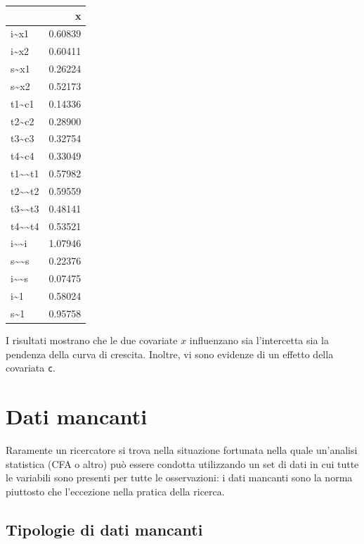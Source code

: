 \documentclass[
  11pt,
]{krantz}
\theoremstyle{definition}
\theoremstyle{definition}
\theoremstyle{definition}
\theoremstyle{definition}
\theoremstyle{remark}
\begin{document}
\begin{longtable}[]{@{}lr@{}}
\toprule
& x \\
\midrule
\endhead
i\textasciitilde x1 & 0.60839 \\
i\textasciitilde x2 & 0.60411 \\
s\textasciitilde x1 & 0.26224 \\
s\textasciitilde x2 & 0.52173 \\
t1\textasciitilde c1 & 0.14336 \\
t2\textasciitilde c2 & 0.28900 \\
t3\textasciitilde c3 & 0.32754 \\
t4\textasciitilde c4 & 0.33049 \\
t1\textasciitilde\textasciitilde t1 & 0.57982 \\
t2\textasciitilde\textasciitilde t2 & 0.59559 \\
t3\textasciitilde\textasciitilde t3 & 0.48141 \\
t4\textasciitilde\textasciitilde t4 & 0.53521 \\
i\textasciitilde\textasciitilde i & 1.07946 \\
s\textasciitilde\textasciitilde s & 0.22376 \\
i\textasciitilde\textasciitilde s & 0.07475 \\
i\textasciitilde1 & 0.58024 \\
s\textasciitilde1 & 0.95758 \\
\bottomrule
\end{longtable}

I risultati mostrano che le due covariate \(x\) influenzano sia l'intercetta sia la pendenza della curva di crescita. Inoltre, vi sono evidenze di un effetto della covariata \texttt{c}.

\hypertarget{ch:missing_data}{%
\chapter{Dati mancanti}\label{ch:missing_data}}

Raramente un ricercatore si trova nella situazione fortunata nella quale un'analisi statistica (CFA o altro) può essere condotta utilizzando un set di dati in cui tutte le variabili sono presenti per tutte le osservazioni: i dati mancanti sono la norma piuttosto che l'eccezione nella pratica della ricerca.

\hypertarget{tipologie-di-dati-mancanti}{%
\section{Tipologie di dati mancanti}\label{tipologie-di-dati-mancanti}}
\end{document}
